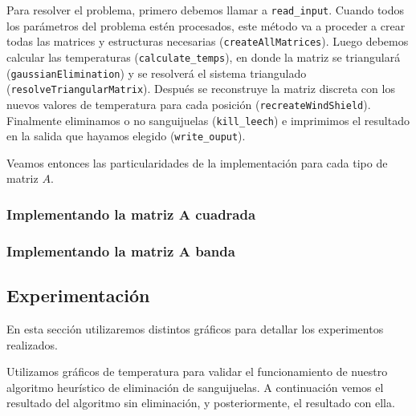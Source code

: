 \vspace{\baselineskip}

Para resolver el problema, primero debemos llamar a \texttt{read\_input}. Cuando todos los parámetros del problema estén procesados, este método va a proceder a crear todas las matrices y estructuras necesarias (\texttt{createAllMatrices}). Luego debemos calcular las temperaturas (\texttt{calculate\_temps}), en donde la matriz se triangulará (\texttt{gaussianElimination}) y se resolverá el sistema triangulado (\texttt{resolveTriangularMatrix}). Después se reconstruye la matriz discreta con los nuevos valores de temperatura para cada posición (\texttt{recreateWindShield}). Finalmente eliminamos o no sanguijuelas (\texttt{kill\_leech}) e imprimimos el resultado en la salida que hayamos elegido (\texttt{write\_ouput}).

Veamos entonces las particularidades de la implementación para cada tipo de matriz $A$.


\subsubsection{Implementando la matriz A cuadrada}

\subsubsection{Implementando la matriz A banda}

\subsection{Experimentación}

	En esta sección utilizaremos distintos gráficos para detallar los experimentos realizados. 

	Utilizamos gráficos de temperatura para validar el funcionamiento de nuestro algoritmo heurístico de eliminación de sanguijuelas. A continuación vemos el resultado del algoritmo sin eliminación, y posteriormente, el resultado con ella.

